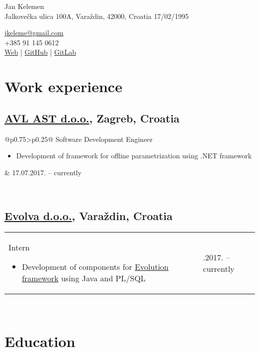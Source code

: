 \documentclass[a4paper]{article}
\makeatletter
\newlength{\tablewidth}
\newenvironment{period}[2]{%
\newcommand{\sarma}{#2}%
\setlength{\tablewidth}{\linewidth}
\addtolength{\tablewidth}{-2\tabcolsep}
\begin{tabular}{@{}p{0.75\tablewidth}>{\raggedleft\arraybackslash}p{0.25\tablewidth}@{}}%
#1 \newline
\begin{itemize}
}{%
\end{itemize} & \sarma \\%
\end{tabular}\\
}
\makeatother
\begin{document}
\fontfamily{\sfdefault}
\selectfont

\begin{minipage}{.5\textwidth}
\LARGE{Jan Kelemen}\\
\normalsize{Jalkove\v{c}ka ulica 100A, Vara\v{z}din, 42000, Croatia}
\normalsize{17/02/1995}
\end{minipage}%
\begin{minipage}{.5\textwidth}
\raggedleft
\href{mailto:jkeleme@gmail.com}{jkeleme@gmail.com} \\
+385 91 145 0612 \\
\href{http://jan-kelemen.github.io/}{Web} | \href{https://github.com/jan-kelemen}{GitHub} | \href{https://gitlab.com/jan-kelemen}{GitLab}
\end{minipage}

\vspace{1em}

\section{Work experience}
\subsection{\href{https://www.avl.com/}{AVL AST d.o.o.}, Zagreb, Croatia}
\begin{period}{Software Development Engineer}{17.07.2017. -- currently}
	\item
		Development of framework for offline parametrization using .NET framework
\end{period}
\subsection{\href{http://www.evolva.hr/hr/index.html}{Evolva d.o.o.}, Vara\v{z}din, Croatia}
\begin{period}{Intern}{22.08.2016. -- 23.09.2016.}
	\item
		Development of components for \href{http://www.evolution-framework.com/}{Evolution framework} using Java and PL/SQL
\end{period}

\section{Education}
\end{document}
